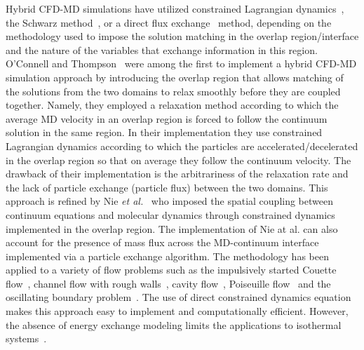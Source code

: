 \documentclass[preprint,12pt]{elsarticle}
\begin{document}
Hybrid CFD-MD simulations have utilized constrained Lagrangian dynamics~\cite{Thompson,Nie,Nie_cavity,Cui,Wang,Yen,Liu}, the Schwarz method~\cite{Hadjicon1,Hadjicon2,Hadjicon3,Werder,Kotsalis}, or a direct flux exchange~\cite{Flekkoy,Wagner,Delgado1,USHER,Time_Mechanism,Giupponi} method, depending on the methodology used to impose the solution matching in the overlap region/interface and the nature of the variables that exchange information in this region. 
O'Connell and Thompson~\cite{Thompson} 
were among the first to implement a hybrid CFD-MD simulation approach by introducing the overlap region that allows matching of the solutions from the two domains to relax smoothly before they are coupled together. Namely, they employed a relaxation method according to which the average MD velocity in an overlap region is forced to follow the continuum solution in the same region. In their implementation they use constrained Lagrangian dynamics according to which the particles are accelerated/decelerated in the overlap region so that on average they follow the continuum velocity. The drawback of their implementation is the arbitrariness of the relaxation rate and the lack of particle exchange (particle flux) between the two domains. 
This approach is refined by Nie {\it{et al.}}~\cite{Nie} 
who imposed the spatial coupling between continuum equations and molecular dynamics through constrained dynamics implemented in the overlap region. The implementation of Nie at al. can also account for the presence of mass flux across the MD-continuum interface implemented via a particle exchange algorithm. The methodology has been applied to a variety of flow problems such as the impulsively started Couette flow~\cite{Thompson}, channel flow with rough walls~\cite{Nie}, cavity flow~\cite{Nie_cavity}, Poiseuille flow~\cite{Yen} and the oscillating boundary problem~\cite{Wang,Liu}. The use of direct constrained dynamics equation makes this approach easy to implement and computationally efficient. However, the absence of energy exchange modeling limits the applications to isothermal systems~\cite{Flekkoy}.
\end{document}
